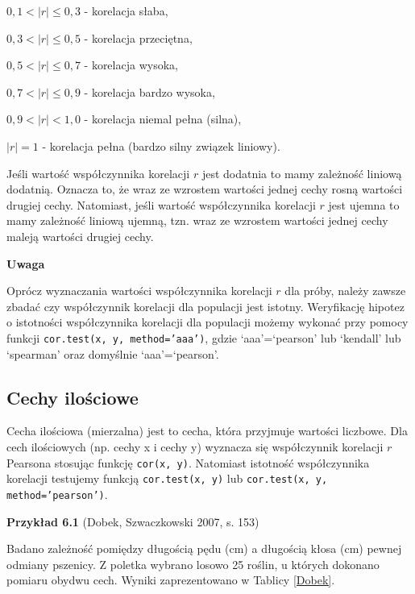 \documentclass[12pt,B5paper,]{book}
\begin{document}
\(0,1 < |r| \leq 0,3\) - korelacja słaba,

\(0,3 < |r| \leq 0,5\) - korelacja przeciętna,

\(0,5 < |r| \leq 0,7\) - korelacja wysoka,

\(0,7 < |r| \leq 0,9\) - korelacja bardzo wysoka,

\(0,9 < |r| < 1,0\) - korelacja niemal pełna (silna),

\(|r| = 1\) - korelacja pełna (bardzo silny związek liniowy).

\vspace{0.8cm}

Jeśli wartość współczynnika korelacji \(r\) jest dodatnia to mamy
zależność liniową dodatnią. Oznacza to, że wraz ze wzrostem wartości
jednej cechy rosną wartości drugiej cechy. Natomiast, jeśli wartość
współczynnika korelacji \(r\) jest ujemna to mamy zależność liniową
ujemną, tzn. wraz ze wzrostem wartości jednej cechy maleją wartości
drugiej cechy.

\vspace{0.8cm}

\textbf{Uwaga}

Oprócz wyznaczania wartości współczynnika korelacji \(r\) dla próby,
należy zawsze zbadać czy współczynnik korelacji dla populacji jest
istotny. Weryfikację hipotez o istotności współczynnika korelacji dla
populacji możemy wykonać przy pomocy funkcji
\texttt{cor.test(x, y, method='aaa')}, gdzie `aaa'=`pearson' lub
`kendall' lub `spearman' oraz domyślnie `aaa'=`pearson'.

\subsection{Cechy ilościowe}\label{cechy-ilosciowe}

Cecha ilościowa (mierzalna) jest to cecha, która przyjmuje wartości
liczbowe. Dla cech ilościowych (np. cechy x i cechy y) wyznacza się
współczynnik korelacji \(r\) Pearsona stosując funkcję
\texttt{cor(x, y)}. Natomiast istotność współczynnika korelacji
testujemy funkcją \texttt{cor.test(x, y)} lub
\texttt{cor.test(x, y, method='pearson')}.

\vspace{0.8cm} \textbf{Przykład 6.1} (Dobek, Szwaczkowski 2007, s. 153)

Badano zależność pomiędzy długością pędu (cm) a długością kłosa (cm)
pewnej odmiany pszenicy. Z poletka wybrano losowo 25 roślin, u których
dokonano pomiaru obydwu cech. Wyniki zaprezentowano w Tablicy
\ref{Dobek}.
\end{document}

